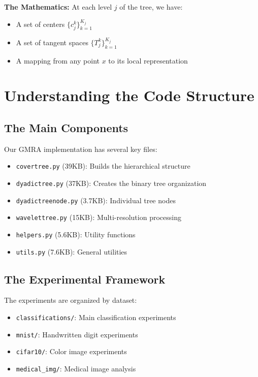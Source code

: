 \documentclass[12pt]{article}
\begin{document}
\textbf{The Mathematics:} At each level $j$ of the tree, we have:
\begin{itemize}
    \item A set of centers $\{c_j^k\}_{k=1}^{K_j}$
    \item A set of tangent spaces $\{T_j^k\}_{k=1}^{K_j}$
    \item A mapping from any point $x$ to its local representation
\end{itemize}

\section{Understanding the Code Structure}

\subsection{The Main Components}

Our GMRA implementation has several key files:

\begin{itemize}
    \item \texttt{covertree.py} (39KB): Builds the hierarchical structure
    \item \texttt{dyadictree.py} (37KB): Creates the binary tree organization
    \item \texttt{dyadictreenode.py} (3.7KB): Individual tree nodes
    \item \texttt{wavelettree.py} (15KB): Multi-resolution processing
    \item \texttt{helpers.py} (5.6KB): Utility functions
    \item \texttt{utils.py} (7.6KB): General utilities
\end{itemize}

\subsection{The Experimental Framework}

The experiments are organized by dataset:
\begin{itemize}
    \item \texttt{classifications/}: Main classification experiments
    \item \texttt{mnist/}: Handwritten digit experiments
    \item \texttt{cifar10/}: Color image experiments
    \item \texttt{medical\_img/}: Medical image analysis
\end{itemize}
\end{document}
